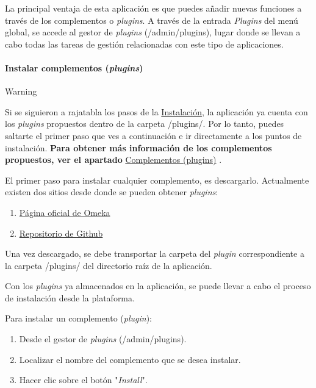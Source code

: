 \documentclass[
]{article}
\providecommand{\tightlist}{%
  \setlength{\itemsep}{0pt}\setlength{\parskip}{0pt}}
\begin{document}
La principal ventaja de esta aplicación es que puedes añadir nuevas
funciones a través de los complementos o \emph{plugins}. A través de la
entrada \emph{Plugins} del menú global, se accede al gestor de
\emph{plugins} ({/admin/plugins}), lugar donde se llevan a cabo todas
las tareas de gestión relacionadas con este tipo de aplicaciones.

\hypertarget{instalar-complementos-plugins}{%
\paragraph{\texorpdfstring{Instalar complementos
(\emph{plugins})}{Instalar complementos (plugins)}}\label{instalar-complementos-plugins}}

Warning

Si se siguieron a rajatabla los pasos de la
\protect\hyperlink{instalaciuxf3n}{Instalación}, la aplicación ya cuenta
con los \emph{plugins} propuestos dentro de la carpeta {/plugins/}. Por
lo tanto, puedes saltarte el primer paso que ves a continuación e ir
directamente a los puntos de instalación. \textbf{Para obtener más
información de los complementos propuestos, ver el apartado}
\protect\hyperlink{complementos-plugins}{Complementos (plugins)} .

El primer paso para instalar cualquier complemento, es descargarlo.
Actualmente existen dos sitios desde donde se pueden obtener
\emph{plugins}:

\begin{enumerate}
\def\labelenumi{\arabic{enumi}.}
\tightlist
\item
  \href{https://omeka.org/classic/plugins/}{Página oficial de Omeka}
\item
  \href{https://daniel-km.github.io/UpgradeToOmekaS/omeka_plugins.html}{Repositorio
  de Github}
\end{enumerate}

Una vez descargado, se debe transportar la carpeta del \emph{plugin}
correspondiente a la carpeta {/plugins/} del directorio raíz de la
aplicación.

Con los \emph{plugins} ya almacenados en la aplicación, se puede llevar
a cabo el proceso de instalación desde la plataforma.

Para instalar un complemento (\emph{plugin}):

\begin{enumerate}
\def\labelenumi{\arabic{enumi}.}
\tightlist
\item
  Desde el gestor de \emph{plugins} ({/admin/plugins}).
\item
  Localizar el nombre del complemento que se desea instalar.
\item
  Hacer clic sobre el botón "\emph{Install}".
\end{enumerate}
\end{document}
